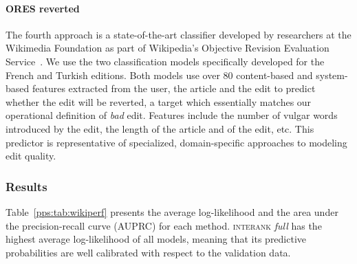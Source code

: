 \paragraph{ORES reverted}
The fourth approach is a state-of-the-art classifier developed by researchers at the Wikimedia Foundation as part of Wikipedia's Objective Revision Evaluation Service~\citep{wikimedia2015artificial}.
We use the two classification models specifically developed for the French and Turkish editions.
Both models use over \num{80} content-based and system-based features extracted from the user, the article and the edit to predict whether the edit will be reverted, a target which essentially matches our operational definition of \emph{bad} edit.
Features include the number of vulgar words introduced by the edit, the length of the article and of the edit, etc.
This predictor is representative of specialized, domain-specific approaches to modeling edit quality.

\subsubsection{Results}

Table~\ref{pps:tab:wikiperf} presents the average log-likelihood and the area under the precision-recall curve (AUPRC) for each method.
\textsc{interank} \emph{full} has the highest average log-likelihood of all models, meaning that its predictive probabilities are well calibrated with respect to the validation data.

